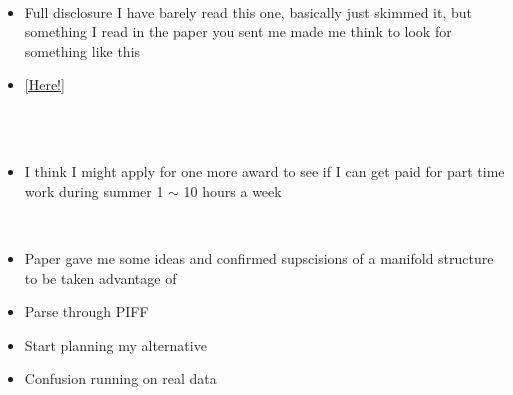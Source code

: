 \documentclass[a4 paper]{article}
\numberwithin{equation}{section}
\newcommand{\0}{\mathbf{0}}
\begin{document}
\clearpage
\clearpage
{}\\ 
\begin{itemize}
    \item Full disclosure I have barely read this one, basically just skimmed it, but something I read in the paper you sent me made me think to look for something like this
    \item \href{https://ar5iv.labs.arxiv.org/html/1904.11044}{[Here!]}
\end{itemize}\\
\\ 
\begin{itemize}
    \item I think I might apply for one more award to see if I can get paid for part time work during summer 1 $\sim$ 10 hours a week
\end{itemize}
\\ 
\begin{itemize}
    \item Paper gave me some ideas and confirmed supscisions of a manifold structure to be taken advantage of
    \item Parse through PIFF
    \item Start planning my alternative
    \item Confusion running on real data
\end{itemize}
\end{document}
